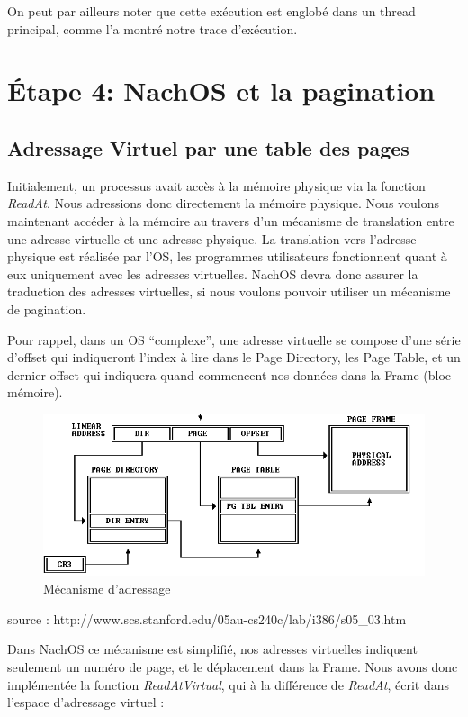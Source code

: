 \documentclass[a4paper,10pt]{article}
\begin{document}
On peut par ailleurs noter que cette exécution est englobé dans un thread principal, comme l'a montré notre trace d'exécution.
\newpage
\section{Étape 4: NachOS et la pagination }
\subsection{Adressage Virtuel par une table des pages}
Initialement, un processus avait accès à la mémoire physique via la fonction \textit{ReadAt}.
Nous adressions donc directement la mémoire physique. Nous voulons maintenant accéder à la mémoire au travers d'un mécanisme de translation entre une adresse virtuelle et une adresse physique.
La translation vers l'adresse physique est réalisée par l'OS, les programmes utilisateurs fonctionnent quant à eux uniquement avec les adresses virtuelles. NachOS devra donc assurer la traduction des adresses
virtuelles, si nous voulons pouvoir utiliser un mécanisme de pagination.

Pour rappel, dans un OS ``complexe'', une adresse virtuelle se compose d'une série d'offset qui indiqueront l'index à lire dans le Page Directory, les Page Table, et un dernier offset qui indiquera quand commencent
nos données dans la Frame (bloc mémoire).

\begin{figure}[h]
  \begin{center}
    \includegraphics[scale=0.39]{./pgtable.png}
   \caption{\label{pgtable}Mécanisme d'adressage}
  \end{center}
\end{figure}
source : http://www.scs.stanford.edu/05au-cs240c/lab/i386/s05\_03.htm
\vspace{0.5cm}

Dans NachOS ce mécanisme est simplifié, nos adresses virtuelles indiquent seulement un numéro de page, et le déplacement dans la Frame.
Nous avons donc implémentée la fonction \textit{ReadAtVirtual}, qui à la différence de \textit{ReadAt}, écrit dans l'espace d'adressage virtuel :
\end{document}
